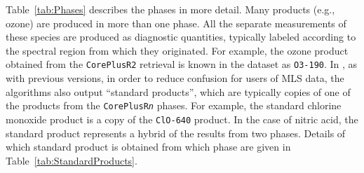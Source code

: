 Table~\ref{tab:Phases} describes the phases in more detail. Many products (e.g., ozone) are produced in more than one phase. All the separate measurements of these species are produced as diagnostic quantities, typically labeled according to the spectral region from which they originated. For example, the ozone product obtained from the \texttt{CorePlusR2} retrieval is known in the \thisv dataset as \texttt{O3-190}. In \thisv, as with previous versions, in order to reduce confusion for users of MLS data, the algorithms also output ``standard products'', which are typically copies of one of the products from the \texttt{CorePlusR\emph{n}} phases. For example, the standard chlorine monoxide product is a copy of the \texttt{ClO-640} product. In the case of \thisv nitric acid, the standard product represents a hybrid of the results from two phases. Details of which standard product is obtained from which phase are given in Table~\ref{tab:StandardProducts}.

\newcommand{\mybox}[2]{\parbox[m]{#1}{\raggedright #2}} \newcommand{\phase}[1]{\mybox{1.0in}{\texttt{#1}}} \newcommand{\species}[1]{\mybox{2.2in}{#1}} \newcommand{\measurements}[1]{\mybox{1.5in}{#1}} \newcommand{\tablecomments}[1]{\mybox{3.6in}{#1}}


